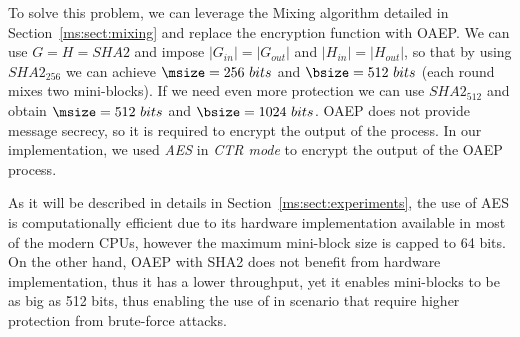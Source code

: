 {To solve this problem, we can leverage the Mixing algorithm detailed in Section~\ref{ms:sect:mixing} and replace the encryption function with OAEP.
We can use $G = H = SHA2$ and impose $|G_{in}| = |G_{out}|$ and $|H_{in}| = |H_{out}|$, so that by using $SHA2_{256}$ we can achieve $\msize = 256\ bits$ and $\bsize = 512\ bits$ (each round mixes two mini-blocks). If we need even more protection we can use $SHA2_{512}$ and obtain $\msize = 512\ bits$ and $\bsize = 1024\ bits$. OAEP does not provide message secrecy, so it is required to encrypt the output of the process. In our implementation, we used {\em AES} in {\em CTR mode} to encrypt the output of the OAEP process.

As it will be described in details in Section~\ref{ms:sect:experiments}, the use of AES is computationally efficient due to its hardware implementation available in most of the modern CPUs, however the maximum mini-block size is capped to 64 bits. On the other hand, OAEP with SHA2 does not benefit from hardware implementation, thus it has a lower throughput, yet it enables mini-blocks to be as big as 512 bits, thus enabling the use of \name in scenario that require higher protection from brute-force attacks.

} %


